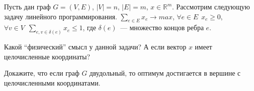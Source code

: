 Пусть дан граф $G = (V, E)$, $|V| = n$, $|E| = m$, $x \in \mathbb{R}^m$. Рассмотрим следующую задачу
линейного программирования. $\sum\limits_{e \in E} x_e \rightarrow max$, $\forall e \in E ~~ x_e \ge 0$,
$\forall v \in V ~~ \sum_{e, v \in \delta(e)} x_e \le 1$, где $\delta(e)$~--- множество концов ребра
$e$.

\begin{enumcyr}
	\item Какой ``физический'' смысл у данной задачи? А если вектор $x$ имеет целочисленные координаты?
    \item Докажите, что если граф $G$ двудольный, то оптимум достигается в вершине с целочисленными
	    координатами.
\end{enumcyr}